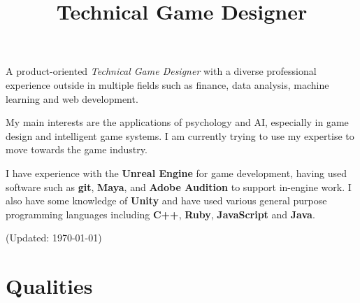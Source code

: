 \documentclass[11pt,a4paper]{moderncv}
\title{Technical Game Designer}               %
\begin{document}
\maketitle

A product-oriented \textit{Technical Game Designer} with a diverse professional experience outside in multiple fields such as finance, data analysis, machine learning and web development. 

My main interests are the applications of psychology and AI, especially in game design and intelligent game systems. I am currently trying to use my expertise to move towards the game industry.

I have experience with the \textbf{Unreal Engine} for game development, having used software such as \textbf{git}, \textbf{Maya}, and \textbf{Adobe Audition} to support in-engine work. I also have some knowledge of \textbf{Unity} and have used various general purpose programming languages including \textbf{C++}, \textbf{Ruby}, \textbf{JavaScript} and \textbf{Java}.

(Updated: \today)

\section{Qualities}
\end{document}
